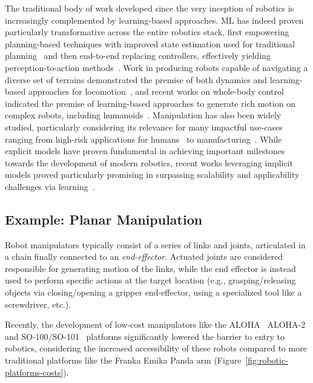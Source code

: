 The traditional body of work developed since the very inception of robotics is increasingly complemented by learning-based approaches.
ML has indeed proven particularly transformative across the entire robotics stack, first empowering planning-based techniques with improved state estimation used for traditional planning~\citep{tangPerceptionNavigationAutonomous2023} and then end-to-end replacing controllers, effectively yielding perception-to-action methods~\citep{koberReinforcementLearningRobotics}.
Work in producing robots capable of navigating a diverse set of terrains demonstrated the premise of both dynamics and learning-based approaches for locomotion~\citep{griffinWalkingStabilizationUsing2017,jiDribbleBotDynamicLegged2023,leeLearningQuadrupedalLocomotion2020,margolisRapidLocomotionReinforcement2022}, and recent works on whole-body control indicated the premise of learning-based approaches to generate rich motion on complex robots, including humanoids~\citep{zhangWoCoCoLearningWholeBody2024,bjorckGR00TN1Open2025}.
Manipulation has also been widely studied, particularly considering its relevance for many impactful use-cases ranging from high-risk applications for humans~\citep{fujitaDevelopmentRobotsNuclear2020,alizadehComprehensiveSurveySpace2024} to manufacturing~\citep{sannemanStateIndustrialRobotics2020}.
While explicit models have proven fundamental in achieving important milestones towards the development of modern robotics, recent works leveraging implicit models proved particularly promising in surpassing scalability and applicability challenges via learning~\citep{koberReinforcementLearningRobotics}.

\subsection{Example: Planar Manipulation}
Robot manipulators typically consist of a series of links and joints, articulated in a chain finally connected to an \emph{end-effector}.
Actuated joints are considered responsible for generating motion of the links, while the end effector is instead used to perform specific actions at the target location (e.g., grasping/releasing objects via closing/opening a gripper end-effector, using a specialized tool like a screwdriver, etc.).

Recently, the development of low-cost manipulators like the ALOHA~\citep{zhaoLearningFineGrainedBimanual2023} ALOHA-2~\citep{aldacoALOHA2Enhanced} and SO-100/SO-101~\citep{knightStandardOpenSO100} platforms significantly lowered the barrier to entry to robotics, considering the increased accessibility of these robots compared to more traditional platforms like the Franka Emika Panda arm (Figure~\ref{fig:robotic-platforms-costs}).

